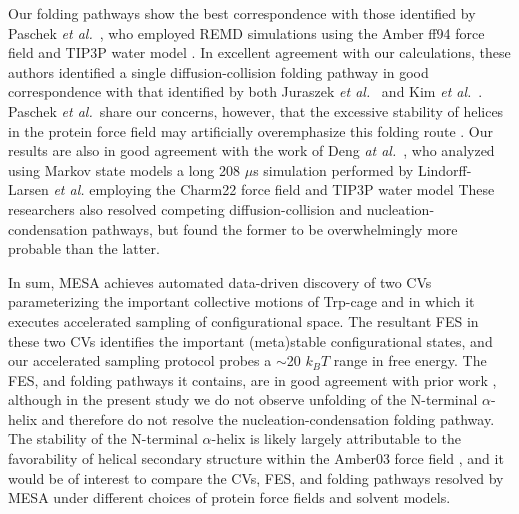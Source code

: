 \documentclass[12pt]{article}
\begin{document}
Our folding pathways show the best correspondence with those identified by Paschek \textit{et al.}\ \cite{paschek2008computing}, who employed REMD simulations using the Amber ff94 force field\cite{cornell1995second} and TIP3P water model \cite{jorgensen1983comparison}. In excellent agreement with our calculations, these authors identified a single diffusion-collision folding pathway in good correspondence with that identified by both Juraszek \textit{et al.}\ \cite{juraszek2006sampling} and Kim \textit{et al.}\ \cite{kim2015systematic}. Paschek \textit{et al.}\ share our concerns, however, that the excessive stability of helices in the protein force field may artificially overemphasize this folding route \cite{paschek2008computing}. Our results are also in good agreement with the work of Deng \textit{at al.}\ \cite{deng2013kinetics}, who analyzed using Markov state models a long 208 $\mu$s simulation performed by Lindorff-Larsen \textit{et al.}\cite{lindorff2011fast}  employing the Charm22 force field \cite{mackerell1998all,mackerell2004extending} and TIP3P water model \cite{jorgensen1983comparison} These researchers also resolved competing diffusion-collision and nucleation-condensation pathways, but found the former to be overwhelmingly more probable than the latter.

In sum, MESA achieves automated data-driven discovery of two CVs parameterizing the important collective motions of Trp-cage and in which it executes accelerated sampling of configurational space. The resultant FES in these two CVs identifies the important (meta)stable configurational states, and our accelerated sampling protocol probes a $\sim$20 $k_B T$ range in free energy. The FES, and folding pathways it contains, are in good agreement with prior work \cite{juraszek2006sampling,kim2015systematic,paschek2008computing,deng2013kinetics}, although in the present study we do not observe unfolding of the N-terminal $\alpha$-helix and therefore do not resolve the nucleation-condensation folding pathway. The stability of the N-terminal $\alpha$-helix is likely largely attributable to the favorability of helical secondary structure within the Amber03 force field \cite{wang2004development,best2008current,paschek2008computing}, and it would be of interest to compare the CVs, FES, and folding pathways resolved by MESA under different choices of protein force fields and solvent models. 
\end{document}
